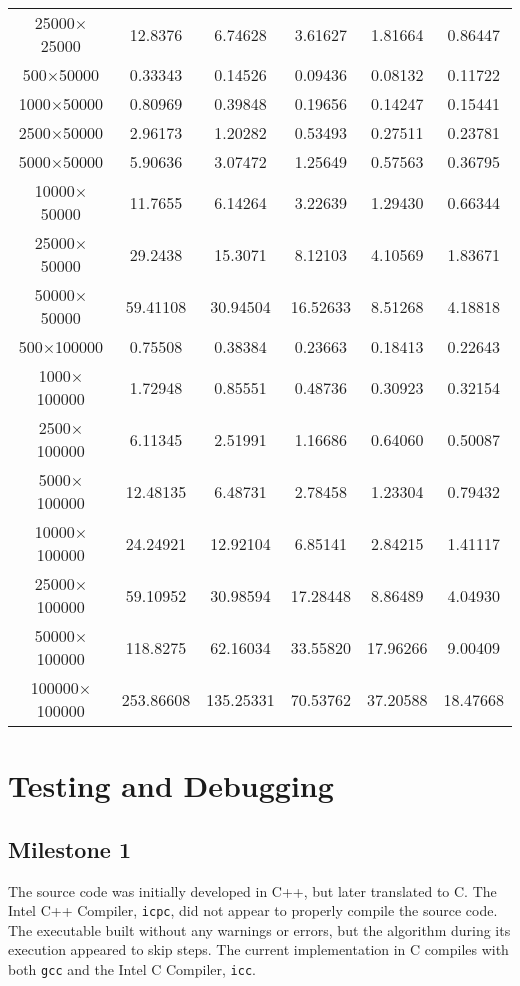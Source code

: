 \documentclass[usletter, 11pt]{extarticle}
\begin{document}
\begin{longtable}{|c|c|c|c|c|c|}
25000$\times$25000   & 12.8376 & 6.74628 & 3.61627 & 1.81664 & 0.86447 \\
500$\times$50000     & 0.33343 & 0.14526 & 0.09436 & 0.08132 & 0.11722 \\
1000$\times$50000    & 0.80969 & 0.39848 & 0.19656 & 0.14247 & 0.15441 \\
2500$\times$50000    & 2.96173 & 1.20282 & 0.53493 & 0.27511 & 0.23781 \\
5000$\times$50000    & 5.90636 & 3.07472 & 1.25649 & 0.57563 & 0.36795 \\
10000$\times$50000   & 11.7655 & 6.14264 & 3.22639 & 1.29430 & 0.66344 \\
25000$\times$50000   & 29.2438 & 15.3071 & 8.12103 & 4.10569 & 1.83671 \\
50000$\times$50000   & 59.41108& 30.94504& 16.52633& 8.51268 & 4.18818 \\
500$\times$100000    & 0.75508 & 0.38384 & 0.23663 & 0.18413 & 0.22643 \\
1000$\times$100000   & 1.72948 & 0.85551 & 0.48736 & 0.30923 & 0.32154 \\
2500$\times$100000   & 6.11345 & 2.51991 & 1.16686 & 0.64060 & 0.50087 \\
5000$\times$100000   & 12.48135& 6.48731 & 2.78458 & 1.23304 & 0.79432 \\
10000$\times$100000  & 24.24921& 12.92104& 6.85141 & 2.84215 & 1.41117 \\
25000$\times$100000  & 59.10952& 30.98594& 17.28448& 8.86489 & 4.04930 \\
50000$\times$100000  & 118.8275& 62.16034& 33.55820& 17.96266& 9.00409 \\
100000$\times$100000 & 253.86608& 135.25331 & 70.53762 & 37.20588 & 18.47668 \\
    \end{longtable}

    \section{Testing and Debugging} 

        \subsection{Milestone 1} The source code was initially developed in
        C++, but later translated to C. The Intel C++ Compiler, \texttt{icpc},
        did not appear to properly compile the source code. The executable
        built without any warnings or errors, but the algorithm during its
        execution appeared to skip steps. The current implementation in C
        compiles with both \texttt{gcc} and the Intel C Compiler, \texttt{icc}.

    
\end{document}
